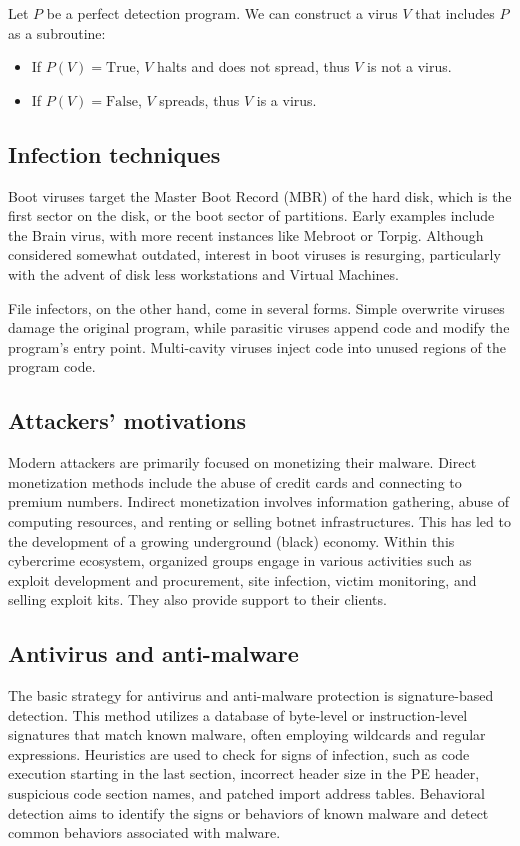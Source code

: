 Let $P$ be a perfect detection program.
We can construct a virus $V$ that includes $P$ as a subroutine:
\begin{itemize}
    \item If $P(V)=\text{True}$, $V$ halts and does not spread, thus $V$ is not a virus.
    \item If $P(V)=\text{False}$, $V$ spreads, thus $V$ is a virus.
\end{itemize}

\subsection{Infection techniques}
Boot viruses target the Master Boot Record (MBR) of the hard disk, which is the first sector on the disk, or the boot sector of partitions. 
Early examples include the Brain virus, with more recent instances like Mebroot or Torpig.
Although considered somewhat outdated, interest in boot viruses is resurging, particularly with the advent of disk less workstations and Virtual Machines.

File infectors, on the other hand, come in several forms. 
Simple overwrite viruses damage the original program, while parasitic viruses append code and modify the program's entry point. 
Multi-cavity viruses inject code into unused regions of the program code.

\subsection{Attackers' motivations}
Modern attackers are primarily focused on monetizing their malware.
Direct monetization methods include the abuse of credit cards and connecting to premium numbers. 
Indirect monetization involves information gathering, abuse of computing resources, and renting or selling botnet infrastructures. 
This has led to the development of a growing underground (black) economy. 
Within this cybercrime ecosystem, organized groups engage in various activities such as exploit development and procurement, site infection, victim monitoring, and selling exploit kits. 
They also provide support to their clients.

\subsection{Antivirus and anti-malware}
The basic strategy for antivirus and anti-malware protection is signature-based detection. 
This method utilizes a database of byte-level or instruction-level signatures that match known malware, often employing wildcards and regular expressions. 
Heuristics are used to check for signs of infection, such as code execution starting in the last section, incorrect header size in the PE header, suspicious code section names, and patched import address tables. 
Behavioral detection aims to identify the signs or behaviors of known malware and detect common behaviors associated with malware.